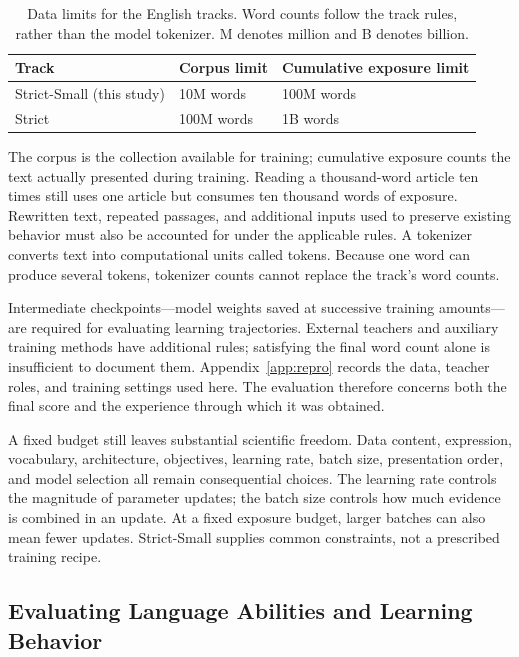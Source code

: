 \begin{table}[htbp]
\caption{Data limits for the English tracks. Word counts follow the track rules, rather than the model tokenizer. M denotes million and B denotes billion.}
\label{tab:tracks}
\begin{tabularx}{\linewidth}{@{}lYY@{}}
\toprule Track & Corpus limit & Cumulative exposure limit\\\midrule
Strict-Small (this study) & 10M words & 100M words\\
Strict & 100M words & 1B words\\
\bottomrule
\end{tabularx}
\end{table}

The corpus is the collection available for training; cumulative exposure counts the text actually presented during training. Reading a thousand-word article ten times still uses one article but consumes ten thousand words of exposure. Rewritten text, repeated passages, and additional inputs used to preserve existing behavior must also be accounted for under the applicable rules. A tokenizer converts text into computational units called tokens. Because one word can produce several tokens, tokenizer counts cannot replace the track's word counts.

Intermediate checkpoints---model weights saved at successive training amounts---are required for evaluating learning trajectories. External teachers and auxiliary training methods have additional rules; satisfying the final word count alone is insufficient to document them. Appendix~\ref{app:repro} records the data, teacher roles, and training settings used here. The evaluation therefore concerns both the final score and the experience through which it was obtained.

A fixed budget still leaves substantial scientific freedom. Data content, expression, vocabulary, architecture, objectives, learning rate, batch size, presentation order, and model selection all remain consequential choices. The learning rate controls the magnitude of parameter updates; the batch size controls how much evidence is combined in an update. At a fixed exposure budget, larger batches can also mean fewer updates. Strict-Small supplies common constraints, not a prescribed training recipe.

\subsection{Evaluating Language Abilities and Learning Behavior}

